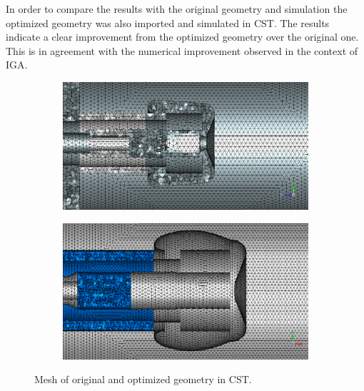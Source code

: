 In order to compare the results with the original geometry and simulation the optimized geometry was also imported and simulated in CST. The results indicate a clear improvement from the optimized geometry over the original one. This is in agreement with the numerical improvement observed in the context of IGA.

\begin{center}
\begin{figure}[H]
   \begin{subfigure}{0.45\textwidth}
      \includegraphics[width=\textwidth]{figures/200kV/cst/efield_orig_mesh}
   \end{subfigure}
   \begin{subfigure}{0.45\textwidth}
      \includegraphics[width=\textwidth]{figures/200kV/cst/efield_mesh_new}
   \end{subfigure}
   \caption{Mesh of original and optimized geometry in CST.}
\end{figure}
\end{center}

